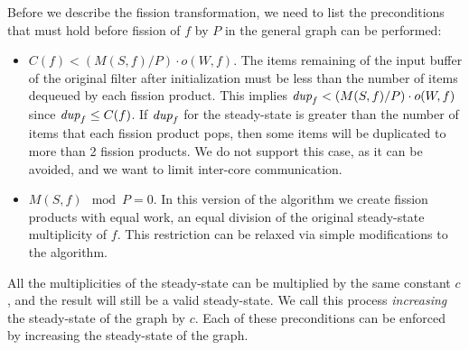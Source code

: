 Before we describe the fission transformation, we need to list the
preconditions that must hold before fission of $f$ by $P$ in the general
graph can be performed:
\begin{itemize}
\item $C(f) < (M(S,f) / P) \cdot o(W, f)$. The items remaining of
  the input buffer of the original filter after initialization must be
  less than the number of items dequeued by each fission product.
  This implies $\mbox{\it dup}_f < (M(S,f) / P) \cdot o(W, f)$ since
  $\mbox{\it dup}_f \le C(f)$.  If $\mbox{\it dup}_f$ for the steady-state is greater
  than the number of items that each fission product pops, then some
  items will be duplicated to more than 2 fission products.  We do not
  support this case, as it can be avoided, and we want to limit
  inter-core communication.

\item $M(S,f) \mod P = 0$. In this version of the algorithm we create
  fission products with equal work, an equal division of the original
  steady-state multiplicity of $f$.  This restriction can be relaxed
  via simple modifications to the algorithm.
\end{itemize}
\noindent All the multiplicities of the steady-state can be multiplied
by the same constant $c$, and the result will still be a valid
steady-state.  We call this process {\it increasing} the steady-state
of the graph by $c$.  Each of these preconditions can be enforced by
increasing the steady-state of the graph.

